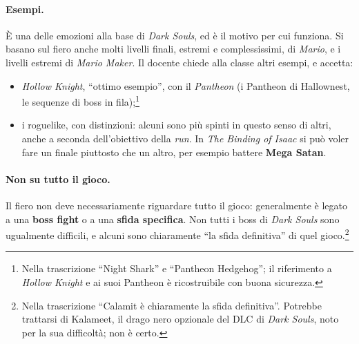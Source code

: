\paragraph{Esempi.} È una delle emozioni alla base di \emph{Dark Souls}, ed è
il motivo per cui funziona. Si basano sul fiero anche molti livelli finali,
estremi e complessissimi, di \emph{Mario}, e i livelli estremi di
\emph{Mario Maker}. Il docente chiede alla classe altri esempi, e accetta:
\begin{itemize}
  \item \emph{Hollow Knight}, ``ottimo esempio'', con il \emph{Pantheon} (i
        Pantheon di Hallownest, le sequenze di boss in fila);\footnote{Nella
        trascrizione ``Night Shark'' e ``Pantheon Hedgehog''; il
        riferimento a \emph{Hollow Knight} e ai suoi Pantheon è
        ricostruibile con buona sicurezza.}
  \item i roguelike, con distinzioni: alcuni sono più spinti in questo senso
        di altri, anche a seconda dell'obiettivo della \emph{run}. In
        \emph{The Binding of Isaac} si può voler fare un finale piuttosto
        che un altro, per esempio battere \textbf{Mega Satan}.
\end{itemize}

\paragraph{Non su tutto il gioco.} Il fiero non deve necessariamente
riguardare tutto il gioco: generalmente è legato a una \textbf{boss fight} o
a una \textbf{sfida specifica}. Non tutti i boss di \emph{Dark Souls} sono
ugualmente difficili, e alcuni sono chiaramente ``la sfida definitiva'' di
quel gioco.\footnote{Nella trascrizione ``Calamit è chiaramente la sfida
definitiva''. Potrebbe trattarsi di Kalameet, il drago nero opzionale del
DLC di \emph{Dark Souls}, noto per la sua difficoltà; non è certo.}

